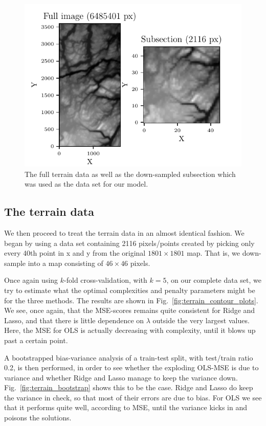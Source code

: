 \documentclass[reprint, english, nofootinbib]{revtex4-2}
\begin{document}


\begin{figure}[h!tb]
    \center
    \includegraphics[width=\columnwidth]{TerrainData.pdf}
    \caption{\label{fig:terrain image}The full terrain data as well as the down-sampled subsection which was used as the data set for our model.}
\end{figure}

\subsection{The terrain data}
\noindent
We then proceed to treat the terrain data in an almost identical fashion. We began by using a data set containing 2116 pixels/points created by picking only every 40th point in x and y from the original $1801\times1801$ map. That is, we down-sample into a map consisting of $46\times46$ pixels.

Once again using $k$-fold cross-validation, with $k=5$, on our complete data set, we try to estimate what the optimal complexities and penalty parameters might be for the three methods. The results are shown in Fig.~\ref{fig:terrain_contour_plots}. We see, once again, that the MSE-scores remains quite consistent for Ridge and Lasso, and that there is little dependence on $\lambda$ outside the very largest values. Here, the MSE for OLS is actually decreasing with complexity, until it blows up past a certain point.

A bootstrapped bias-variance analysis of a train-test split, with test/train ratio 0.2, is then performed, in order to see whether the exploding OLS-MSE is due to variance and whether Ridge and Lasso manage to keep the variance down. Fig.~\ref{fig:terrain_bootstrap} shows this to be the case. Ridge and Lasso do keep the variance in check, so that most of their errors are due to bias. For OLS we see that it performs quite well, according to MSE, until the variance kicks in and poisons the solutions.
\end{document}
